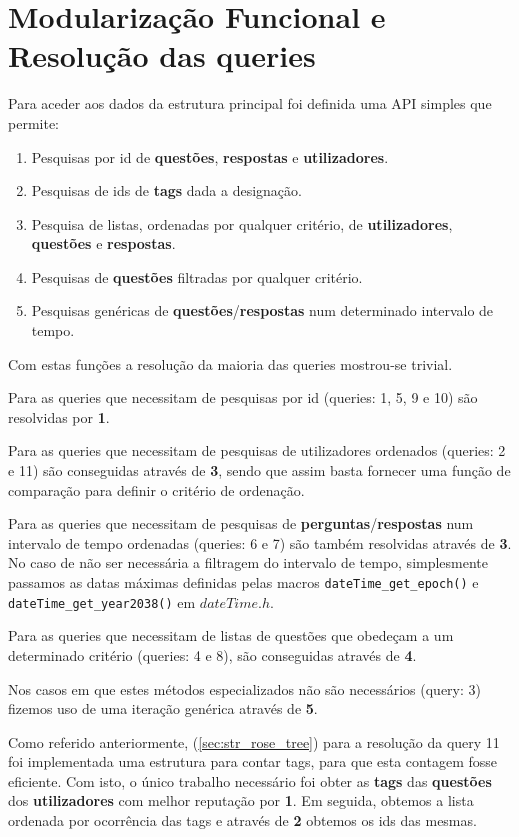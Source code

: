 \documentclass[10pt,a4paper]{article}
\begin{document}
\section{Modularização Funcional e Resolução das queries}
    Para aceder aos dados da estrutura principal foi definida uma API
    simples que permite:
    \begin{enumerate}[1.]
        \item Pesquisas por id de \textbf{questões}, \textbf{respostas} e
        \textbf{utilizadores}.
        \item Pesquisas de ids de \textbf{tags} dada a designação.
        \item Pesquisa de listas, ordenadas por qualquer critério, de
        \textbf{utilizadores}, \textbf{questões} e \textbf{respostas}.
        \item Pesquisas de \textbf{questões} filtradas por qualquer critério.
        \item Pesquisas genéricas de \textbf{questões}/\textbf{respostas}
        num determinado intervalo de tempo.
    \end{enumerate}

    Com estas funções a resolução da maioria das queries mostrou-se
    trivial.

    Para as queries que necessitam de pesquisas por id (queries: 1, 5, 9 e 10)
    são resolvidas por \textbf{1}.

    Para as queries que necessitam de pesquisas de utilizadores ordenados
    (queries: 2 e 11) são conseguidas através de \textbf{3}, sendo que assim
    basta fornecer uma função de comparação para definir o critério de ordenação.

    Para as queries que necessitam de pesquisas de
    \textbf{perguntas}/\textbf{respostas} num intervalo de tempo ordenadas
    (queries: 6 e 7) são também resolvidas através de \textbf{3}. No caso de não
    ser necessária a filtragem do intervalo de tempo, simplesmente passamos as
    datas máximas definidas pelas macros \texttt{dateTime_get_epoch()} e
    \texttt{dateTime_get_year2038()} em $dateTime.h$.

    Para as queries que necessitam de listas de questões que obedeçam a um
    determinado critério (queries: 4 e 8), são conseguidas através de \textbf{4}.

    Nos casos em que estes métodos especializados não são necessários (query: 3)
    fizemos uso de uma iteração genérica através de \textbf{5}.

    Como referido anteriormente, (\ref{sec:str_rose_tree}) para a resolução da
    query 11 foi implementada uma estrutura para contar tags, para que esta
    contagem fosse eficiente. Com isto, o único trabalho necessário foi obter as
    \textbf{tags} das \textbf{questões} dos \textbf{utilizadores} com melhor
    reputação por \textbf{1}. Em seguida, obtemos a lista ordenada por ocorrência
    das tags e através de \textbf{2} obtemos os ids das mesmas.
\end{document}
